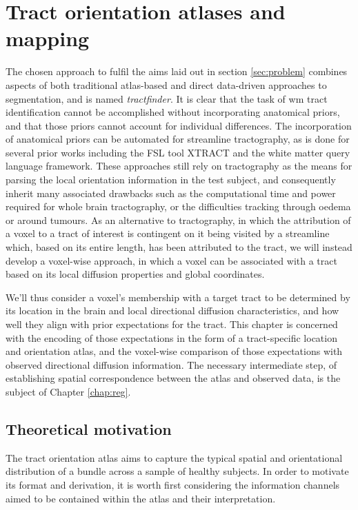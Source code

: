 \chapter{Tract orientation atlases and mapping}
\label{chap:atlas}

The chosen approach to fulfil the aims laid out in section \ref{sec:problem} combines aspects of both traditional atlas-based and direct data-driven approaches to segmentation, and is named \textit{tractfinder}.
It is clear that the task of \gls{wm} tract identification cannot be accomplished without incorporating anatomical priors, and that those priors cannot account for individual differences.
The incorporation of anatomical priors can be automated for streamline tractography, as is done for several prior works including the FSL tool XTRACT\autocite{Warrington2020} and the white matter query language framework.\autocite{Wassermann2016}
These approaches still rely on tractography as the means for parsing the local orientation information in the test subject, and consequently inherit many associated drawbacks such as the computational time and power required for whole brain tractography, or the difficulties tracking through oedema or around tumours.
As an alternative to tractography, in which the attribution of a voxel to a tract of interest is contingent on it being visited by a streamline which, based on its entire length, has been attributed to the tract, we will instead develop a voxel-wise approach, in which a voxel can be associated with a tract based on its local diffusion properties and global coordinates.

We'll thus consider a voxel's membership with a target tract to be determined by its location in the brain and local directional diffusion characteristics, and how well they align with prior expectations for the tract.
This chapter is concerned with the encoding of those expectations in the form of a tract-specific location and orientation atlas, and the voxel-wise comparison of those expectations with observed directional diffusion information.
The necessary intermediate step, of establishing spatial correspondence between the atlas and observed data, is the subject of Chapter \ref{chap:reg}.

\section{Theoretical motivation}

The tract orientation atlas aims to capture the typical spatial and orientational distribution of a bundle across a sample of healthy subjects.
In order to motivate its format and derivation, it is worth first considering the information channels aimed to be contained within the atlas and their interpretation.

